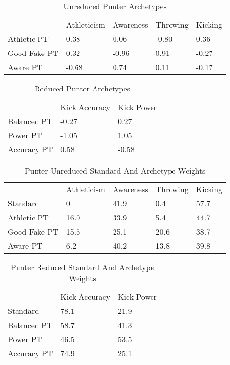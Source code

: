 \documentclass[11pt]{article}
\begin{document}
\begin{table}[]
\centering
\caption{Unreduced Punter Archetypes}
\label{UnreducedPunter}
\begin{tabular}{lllll}
             & Athleticism & Awareness & Throwing & Kicking \\
Athletic PT  & 0.38        & 0.06      & -0.80    & 0.36    \\
Good Fake PT & 0.32        & -0.96     & 0.91     & -0.27   \\
Aware PT     & -0.68       & 0.74      & 0.11     & -0.17  
\end{tabular}
\end{table}

\begin{table}[]
\centering
\caption{Reduced Punter Archetypes}
\label{ReducedPunter}
\begin{tabular}{lll}
            & Kick Accuracy & Kick Power \\
Balanced PT & -0.27         & 0.27       \\
Power PT    & -1.05         & 1.05       \\
Accuracy PT & 0.58          & -0.58     
\end{tabular}
\end{table}

\begin{table}[]
\centering
\caption{Punter Unreduced Standard And Archetype Weights}
\label{PunterUnreducedWeights}
\begin{tabular}{lllll}
             & Athleticism & Awareness & Throwing & Kicking \\
Standard     & 0           & 41.9      & 0.4      & 57.7    \\
Athletic PT  & 16.0        & 33.9      & 5.4      & 44.7    \\
Good Fake PT & 15.6        & 25.1      & 20.6     & 38.7    \\
Aware PT     & 6.2         & 40.2      & 13.8     & 39.8   
\end{tabular}
\end{table}

\begin{table}[]
\centering
\caption{Punter Reduced Standard And Archetype Weights}
\label{PunterReducedWeights}
\begin{tabular}{lll}
            & Kick Accuracy & Kick Power \\
Standard    & 78.1          & 21.9       \\
Balanced PT & 58.7          & 41.3       \\
Power PT    & 46.5          & 53.5       \\
Accuracy PT & 74.9          & 25.1      
\end{tabular}
\end{table}
\end{document}
